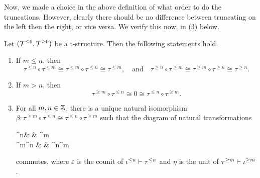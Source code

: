 Now, we made a choice in the above definition of what order to do the truncations. However, clearly there should be no difference between truncating on the left then the right, or vice versa.
We verify this now, in (3) below.
\begin{proposition}\label{prop:t-structure-truncation-relations}
	Let \((\mathcal{T}^{\leq 0},\mathcal{T}^{\geq 0})\) be a t-structure. Then the following statements hold.
	\begin{enumerate}[label=(\arabic*)]
		\item If \(m\leq n\), then
		\[ \tau^{\leq n}\circ\tau^{\leq m} \cong \tau^{\leq m}\circ\tau^{\leq n} \cong \tau^{\leq m},\quad \text{and}\quad \tau^{\geq n}\circ\tau^{\geq m} \cong \tau^{\geq m}\circ\tau^{\geq n} \cong \tau^{\geq n}. \]
		\item If \(m > n\), then
		\[ \tau^{\geq m}\circ\tau^{\leq n} \cong 0 \cong \tau^{\leq n}\circ\tau^{\geq m}. \]
		\item For all \(m,n\in\mathbb{Z}\), there is a unique natural isomorphism \(\beta\!:\tau^{\geq m}\circ\tau^{\leq n}\cong\tau^{\leq n}\circ\tau^{\geq m}\) such that the diagram
		of natural transformations
		\begin{diagram*}
			\tau^{\leq n} & \1  & \tau^{\geq m} \\
			\tau^{\geq m}\tau^{\leq n}  & & \tau^{\leq n}\tau^{\geq m}
		\end{diagram*}
		commutes, where \(\varepsilon\) is the counit of \(\iota^{\leq n}\vdash\tau^{\leq n}\) and \(\eta\) is the unit of \(\tau^{\geq m}\vdash\iota^{\geq m}\).
	\end{enumerate}
\end{proposition}
